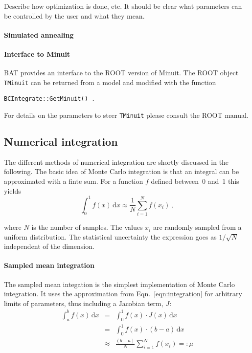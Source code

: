 \documentclass[11pt, a4paper]{article}
\begin{document}
Describe how optimization is done, etc. It should be clear what
parameters can be controlled by the user and what they mean.

\paragraph{Simulated annealing} 

\paragraph{Interface to Minuit} 

BAT provides an interface to the ROOT version of Minuit. The ROOT object 
\verb|TMinuit| can be returned from a model and modified with the function 
%
\begin{verbatim}
BCIntegrate::GetMinuit() . 
\end{verbatim} 

\noindent 
For details on the parameters to steer \verb|TMinuit| please consult the ROOT manual. 


\subsection{Numerical integration} 
\label{subsection:integration} 

The different methods of numerical integration are shortly discussed
in the following. The basic idea of Monte Carlo integration is that an
integral can be approximated with a finte sum. For a function $f$
defined between~0 and~1 this yields
% 
\begin{equation}
\int_{0}^{1} f(x) \, \mathrm{d}x \approx \frac{1}{N} \sum_{i=1}^{N} f(x_{i}) \, , 
\label{eqn:integration}
\end{equation} 

\noindent 
where $N$ is the number of samples. The values $x_{i}$ are randomly
sampled from a uniform distribution. The statistical uncertainty the
expression goes as $1/\sqrt{N}$ independent of the dimension. 

\paragraph{Sampled mean integration} 

The sampled mean integation is the simplest implementation of Monte
Carlo integration. It uses the approximation from
Eqn.~\ref{eqn:integration} for arbitrary limits of parameters, thus
including a Jacobian term, $J$:
%
\begin{eqnarray}
\int_{a}^{b} f(x) \, \mathrm{d}x & = & \int_{0}^{1} f(x) \cdot J(x) \, \mathrm{d}x \\ 
                                 & = & \int_{0}^{1} f(x) \cdot (b - a) \, \mathrm{d}x \\ 
				 & \approx & \frac{(b - a)}{N} \sum_{i=1}^{N} f(x_{i}) =: \mu
\end{eqnarray} 
\end{document}
